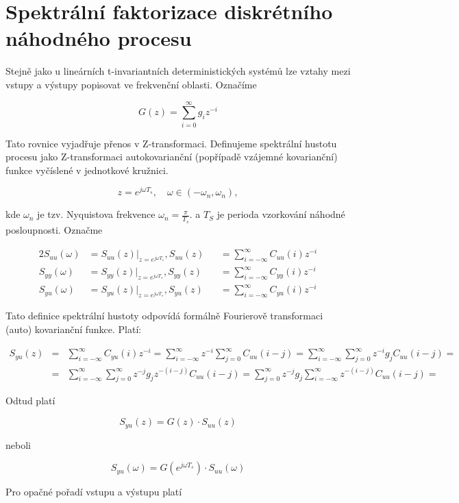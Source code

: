 \chapter{Spektrální faktorizace diskrétního náhodného procesu}
Stejně jako u lineárních t-invariantních deterministických systémů lze vztahy mezi vstupy a výstupy popisovat ve frekvenční oblasti. Označíme

\[ G(z) = \sum_{i=0}^\infty g_iz^{-i} \]

Tato rovnice vyjadřuje přenos v Z-transformaci. Definujeme spektrální hustotu procesu jako Z-transformaci autokovarianční (popřípadě vzájemné kovarianční) funkce vyčíslené v jednotkové kružnici.

\[ z=e^{j\omega T_s},\quad \omega\in(-\omega_n,\omega_n), \]

kde $\omega_n$ je tzv. Nyquistova frekvence $\omega_n = \frac{\pi}{T_s}$. a $T_S$ je perioda vzorkování náhodné posloupnosti. Označme

\begin{alignat*}{2}
S_{uu}(\omega) & = S_{uu}(z)|_{z=e^{j\omega T_s}}, S_{uu}(z) && = \sum_{i=-\infty}^\infty C_{uu}(i)z^{-i}\\
S_{yy}(\omega) & = S_{yy}(z)|_{z=e^{j\omega T_s}}, S_{yy}(z) && = \sum_{i=-\infty}^\infty C_{yy}(i)z^{-i}\\
S_{yu}(\omega) & = S_{yu}(z)|_{z=e^{j\omega T_s}}, S_{yu}(z) && = \sum_{i=-\infty}^\infty C_{yu}(i)z^{-i}
\end{alignat*}

Tato definice spektrální hustoty odpovídá formálně Fourierově transformaci (auto) kovarianční funkce. Platí:

\begin{eqnarray*}
S_{yu}(z) & = & \sum_{i=-\infty}^\infty C_{yu}(i)z^{-i} = \sum_{i=-\infty}^\infty z^{-i} \sum_{j=0}^\infty C_{uu}(i-j) = \sum_{i=-\infty}^\infty \sum_{j=0}^\infty z^{-i} g_j C_{uu}(i-j) = \\
& = & \sum_{i=-\infty}^\infty \sum_{j=0}^\infty z^{-j} g_j z^{-(i-j)} C_{uu}(i-j) = \sum_{j=0}^\infty z^{-j}g_j \sum_{i=-\infty}^\infty z^{-(i-j)} C_{uu}(i-j) =
\end{eqnarray*}

Odtud platí

\[ S_{yu}(z) = G(z)\cdot S_{uu}(z) \]

neboli

\[ S_{yu}(\omega) = G\left(e^{j\omega T_s}\right)\cdot S_{uu}(\omega) \]

Pro opačné pořadí vstupu a výstupu platí

